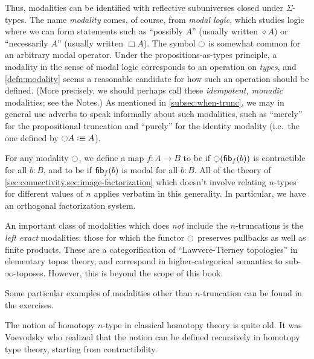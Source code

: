 Thus, modalities can be identified with reflective subuniverses closed under $\Sigma$-types.
The name \emph{modality} comes, of course, from \emph{modal logic}, which studies logic where we can form statements such as ``possibly $A$'' (usually written $\diamond A$) or ``necessarily $A$'' (usually written $\Box A$).
The symbol $\ocircle$ is somewhat common for an arbitrary modal operator. %
Under the propositions-as-types principle, a modality in the sense of modal logic corresponds to an operation on \emph{types}, and \autoref{defn:modality} seems a reasonable candidate for how such an operation should be defined.
(More precisely, we should perhaps call these \emph{idempotent, monadic} modalities; see the Notes.)
%
As mentioned in \autoref{subsec:when-trunc}, we may in general use adverbs to speak informally about such modalities, such as ``merely'' for the propositional truncation and ``purely'' for the identity modality (i.e.\ the one defined by $\ocircle A \vcentcolon\equiv A$).

For any modality $\ocircle$, we define a map $f:A\to B$ to be 
%
%
if $\ocircle({\mathsf{fib}}_{f}(b))$ is contractible for all $b:B$, and to be 
%
%
if ${\mathsf{fib}}_{f}(b)$ is modal for all $b:B$.
All of the theory of \autoref{sec:connectivity,sec:image-factorization} which doesn't involve relating $n$-types for different values of $n$ applies verbatim in this generality.
In particular, we have an orthogonal factorization system.

An important class of modalities which does \emph{not} include the $n$-trun\-ca\-tions is the \emph{left exact} modalities: those for which the functor $\ocircle$ preserves pullbacks as well as finite products.
These are a categorification of ``Lawvere-Tierney topologies'' in elementary topos theory, and correspond in higher-categorical semantics to sub-$\infty$-toposes.
However, this is beyond the scope of this book.

Some particular examples of modalities other than $n$-truncation can be found in the exercises.


\sectionNotes

The notion of homotopy $n$-type in classical homotopy theory is quite old.
It was Voevodsky who realized that the notion can be defined recursively in homotopy type theory, starting from contractibility.

